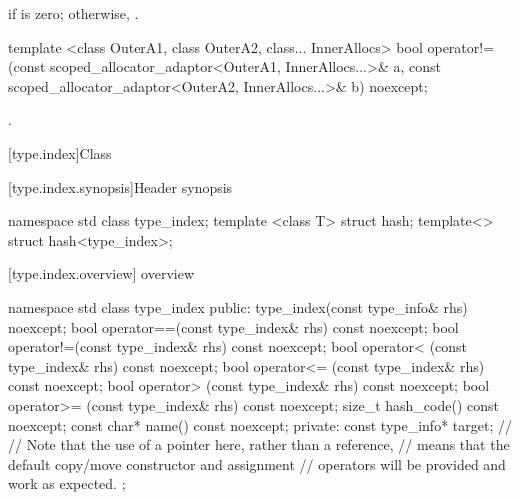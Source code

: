\begin{itemdescr}
\pnum
\returns {} if
 is zero;
otherwise, 
\tcode{\&\&} .
\end{itemdescr}

%
%
\begin{itemdecl}
template <class OuterA1, class OuterA2, class... InnerAllocs>
  bool operator!=(const scoped_allocator_adaptor<OuterA1, InnerAllocs...>& a,
                  const scoped_allocator_adaptor<OuterA2, InnerAllocs...>& b) noexcept;
\end{itemdecl}

\begin{itemdescr}
\pnum
\returns {}.
\end{itemdescr}

[type.index]{Class }

%
[type.index.synopsis]{Header  synopsis}

\begin{codeblock}
namespace std {
  class type_index;
  template <class T> struct hash;
  template<> struct hash<type_index>;
}
\end{codeblock}

[type.index.overview]{ overview}

\begin{codeblock}
namespace std {
  class type_index {
  public:
    type_index(const type_info& rhs) noexcept;
    bool operator==(const type_index& rhs) const noexcept;
    bool operator!=(const type_index& rhs) const noexcept;
    bool operator< (const type_index& rhs) const noexcept;
    bool operator<= (const type_index& rhs) const noexcept;
    bool operator> (const type_index& rhs) const noexcept;
    bool operator>= (const type_index& rhs) const noexcept;
    size_t hash_code() const noexcept;
    const char* name() const noexcept;
  private:
    const type_info* target;    // \expos
    // Note that the use of a pointer here, rather than a reference,
    // means that the default copy/move constructor and assignment
    // operators will be provided and work as expected.
  };
}
\end{codeblock}

